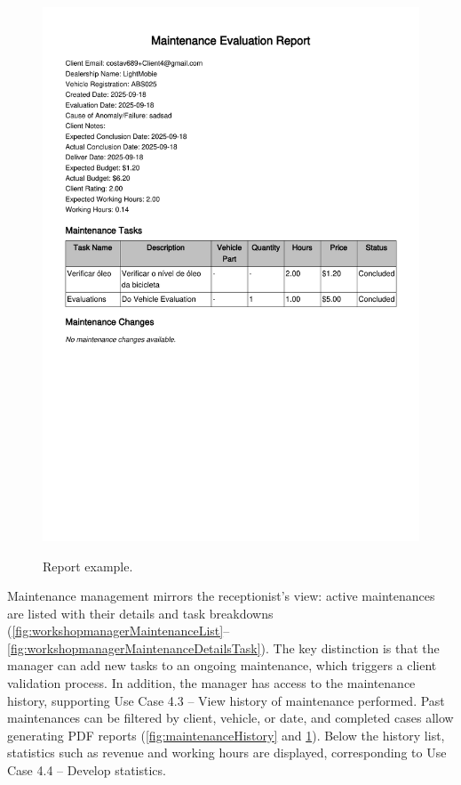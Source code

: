 \begin{figure}[h]
  \caption{Report example.}
  \centering
  \includegraphics[width=\textwidth]{figs/Implementation/workshopmanager/report}
  \label{fig:report}
\end{figure}


Maintenance management mirrors the receptionist's view: active maintenances are listed with their details and task breakdowns (\ref{fig:workshopmanagerMaintenanceList}–\ref{fig:workshopmanagerMaintenanceDetailsTask}). The key distinction is that the manager can add new tasks to an ongoing maintenance, which triggers a client validation process. In addition, the manager has access to the maintenance history, supporting Use Case 4.3 – View history of maintenance performed. Past maintenances can be filtered by client, vehicle, or date, and completed cases allow generating PDF reports (\ref{fig:maintenanceHistory} and \ref{fig:report}). Below the history list, statistics such as revenue and working hours are displayed, corresponding to Use Case 4.4 – Develop statistics.


